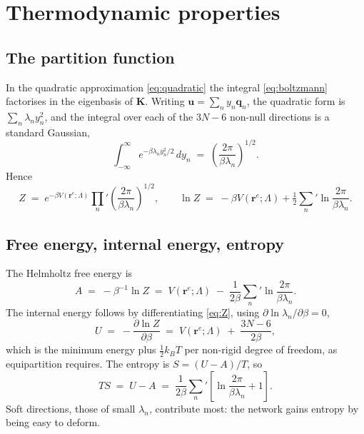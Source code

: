 \documentclass[11pt]{article}
\newcommand{\rr}{\mathbf{r}}
\newcommand{\KK}{\mathbf{K}}
\newcommand{\LL}{\Lambda}
\newcommand{\re}{\rr^{e}}
\begin{document}
\section{Thermodynamic properties}
\label{sec:thermo}

\subsection{The partition function}

In the quadratic approximation \eqref{eq:quadratic} the integral
\eqref{eq:boltzmann} factorises in the eigenbasis of $\KK$. Writing
$\mathbf{u} = \sum_n y_n \mathbf{q}_n$, the quadratic form is
$\sum_n \lambda_n y_n^2$, and the integral over each of the $3N-6$ non-null
directions is a standard Gaussian,
\begin{equation}
\int_{-\infty}^{\infty} e^{-\beta\lambda_n y_n^2/2}\, dy_n
\;=\; \left(\frac{2\pi}{\beta\lambda_n}\right)^{1/2}.
\end{equation}
Hence
\begin{equation}
\boxed{\;
Z \;=\; e^{-\beta V(\re;\LL)} \prod_n{}' \left(\frac{2\pi}{\beta\lambda_n}\right)^{1/2},
\qquad
\ln Z \;=\; -\beta V(\re;\LL) + \tfrac12 \sum_n{}' \ln\frac{2\pi}{\beta\lambda_n}.
\;}
\label{eq:Z}
\end{equation}

\subsection{Free energy, internal energy, entropy}

The Helmholtz free energy is
\begin{equation}
A \;=\; -\beta^{-1}\ln Z
\;=\; V(\re;\LL) \;-\; \frac{1}{2\beta}\sum_n{}' \ln\frac{2\pi}{\beta\lambda_n}.
\label{eq:A}
\end{equation}
The internal energy follows by differentiating \eqref{eq:Z}, using
$\partial\ln\lambda_n/\partial\beta = 0$,
\begin{equation}
U \;=\; -\frac{\partial \ln Z}{\partial \beta}
\;=\; V(\re;\LL) \;+\; \frac{3N-6}{2\beta},
\label{eq:U}
\end{equation}
which is the minimum energy plus $\tfrac12 k_B T$ per non-rigid degree of freedom,
as equipartition requires. The entropy is $S = (U-A)/T$, so
\begin{equation}
T S \;=\; U - A \;=\; \frac{1}{2\beta}\sum_n{}'
\left[\ln\frac{2\pi}{\beta\lambda_n} + 1\right].
\label{eq:S}
\end{equation}
Soft directions, those of small $\lambda_n$, contribute most: the network gains
entropy by being easy to deform.
\end{document}
